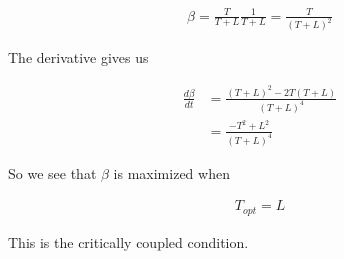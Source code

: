 \documentclass[12pt]{article}
\begin{document}
\begin{align}
\beta = \frac{T}{T+L} \frac{1}{T+L} = \frac{T}{(T+L)^2}
\end{align}

The derivative gives us

\begin{align}
\frac{d\beta}{dt} &= \frac{(T+L)^2 - 2T(T+L)}{(T+L)^4}\\
&= \frac{-T^2 + L^2}{(T+L)^4}
\end{align}

So we see that $\beta$ is maximized when

\begin{align}
T_{opt} = L
\end{align}

This is the critically coupled condition.

	
\end{document}
